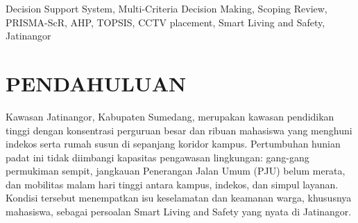 \documentclass[conference]{IEEEtran}
\begin{document}
\maketitle

\begin{abstract}
Permukiman mahasiswa Jatinangor diwarnai gang sempit, penerangan jalan terbatas, mobilitas malam tinggi, dan penempatan CCTV yang sporadis akibat keterbatasan anggaran, sehingga alokasi fasilitas pengawasan memerlukan prioritisasi yang terukur. Kajian ini memetakan literatur Decision Support System (DSS) untuk urban surveillance dan public safety facility placement melalui scoping review berbasis PRISMA-ScR di database Scopus (TITLE-ABS-KEY; 2021--2026, artikel, bahasa Inggris), dengan alur seleksi 582 rekaman disaring, 416 laporan diminta untuk diambil, 121 laporan dinilai pada tahap teks lengkap, dan 12 studi disertakan. Sintesis menunjukkan lima pola arsitektur DSS (GIS-MCDM, optimasi coverage, expert-driven, simulasi-DSS, dan policy-MCDA), sebaran metode MCDM dengan pola dominan AHP untuk pembobotan dan TOPSIS untuk perankingan, serta taksonomi kriteria benefit, cost, dan context-dependent. Berdasarkan sintesis tersebut, dirumuskan model konseptual DSS untuk Jatinangor berupa alternatif segmen gang (A1--A5), matriks sembilan kriteria keselamatan (C1--C9), skema pembobotan AHP tiga kelompok pemangku kepentingan, dan perankingan TOPSIS yang menghasilkan peta prioritas penempatan CCTV bertahap sesuai anggaran.
\end{abstract}

\begin{IEEEkeywords}
Decision Support System, Multi-Criteria Decision Making, Scoping Review, PRISMA-ScR, AHP, TOPSIS, CCTV placement, Smart Living and Safety, Jatinangor
\end{IEEEkeywords}

\section{PENDAHULUAN}

Kawasan Jatinangor, Kabupaten Sumedang, merupakan kawasan pendidikan tinggi dengan konsentrasi perguruan besar dan ribuan mahasiswa yang menghuni indekos serta rumah susun di sepanjang koridor kampus. Pertumbuhan hunian padat ini tidak diimbangi kapasitas pengawasan lingkungan: gang-gang permukiman sempit, jangkauan Penerangan Jalan Umum (PJU) belum merata, dan mobilitas malam hari tinggi antara kampus, indekos, dan simpul layanan. Kondisi tersebut menempatkan isu keselamatan dan keamanan warga, khususnya mahasiswa, sebagai persoalan Smart Living and Safety yang nyata di Jatinangor.
\end{document}
